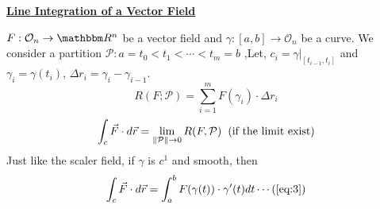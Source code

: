 \documentclass[Analysis-3]{subfiles}
\begin{document}
\begin{center}
    \large \underline{\textbf{Line Integration of a Vector Field} }
\end{center}

$F:\mathcal{O}_n \to \R^n$ be a vector field and $\gamma:[a,b] \to \mathcal{O}_n$ be a curve. We consider a partition $\mathcal{P}: a =t_0<t_1<\cdots < t_m=b$ ,Let, $c_i = \gamma|_{[t_{i-1},t_i]}$ and $\gamma_i = \gamma(t_i)$, $\Delta r_i = \gamma_{i} - \gamma_{i-1}$.
\[R(F;\mathcal{P})= \sum_{i=1}^m F(\gamma_i)\cdot \Delta r_i\]
\[\int_c \vec{F}\cdot d\vec{r} = \lim_{\norm{\mathcal{P}}\to 0} R(F,\mathcal{P}) \hspace{0.2cm}(\text{if the limit exist})\]
Just like the scaler field, if $\gamma$ is $c^1$ and smooth, then 
\[\int_c \vec{F}\cdot d\vec{r} = \int_a^b F(\gamma(t))\cdot \gamma'(t) dt \label{eq:3} \cdots (\ref{eq:3})\]
\end{document}
